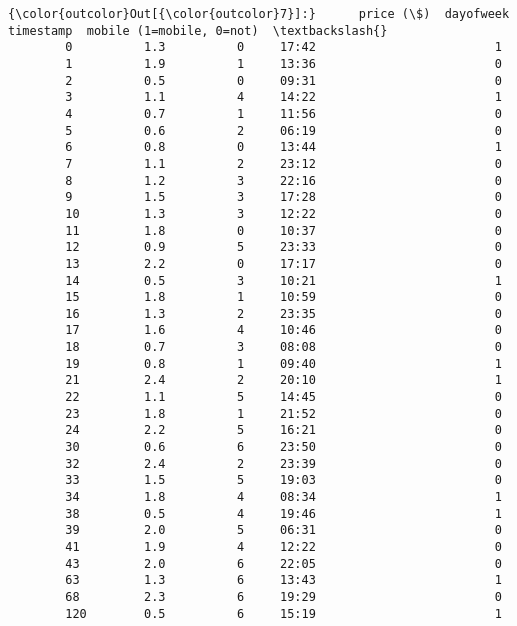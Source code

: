 \documentclass[11pt]{article}
\begin{document}
\begin{Verbatim}[commandchars=\\\{\}]
{\color{outcolor}Out[{\color{outcolor}7}]:}      price (\$)  dayofweek timestamp  mobile (1=mobile, 0=not)  \textbackslash{}
        0          1.3          0     17:42                         1   
        1          1.9          1     13:36                         0   
        2          0.5          0     09:31                         0   
        3          1.1          4     14:22                         1   
        4          0.7          1     11:56                         0   
        5          0.6          2     06:19                         0   
        6          0.8          0     13:44                         1   
        7          1.1          2     23:12                         0   
        8          1.2          3     22:16                         0   
        9          1.5          3     17:28                         0   
        10         1.3          3     12:22                         0   
        11         1.8          0     10:37                         0   
        12         0.9          5     23:33                         0   
        13         2.2          0     17:17                         0   
        14         0.5          3     10:21                         1   
        15         1.8          1     10:59                         0   
        16         1.3          2     23:35                         0   
        17         1.6          4     10:46                         0   
        18         0.7          3     08:08                         0   
        19         0.8          1     09:40                         1   
        21         2.4          2     20:10                         1   
        22         1.1          5     14:45                         0   
        23         1.8          1     21:52                         0   
        24         2.2          5     16:21                         0   
        30         0.6          6     23:50                         0   
        32         2.4          2     23:39                         0   
        33         1.5          5     19:03                         0   
        34         1.8          4     08:34                         1   
        38         0.5          4     19:46                         1   
        39         2.0          5     06:31                         0   
        41         1.9          4     12:22                         0   
        43         2.0          6     22:05                         0   
        63         1.3          6     13:43                         1   
        68         2.3          6     19:29                         0   
        120        0.5          6     15:19                         1   
        

\end{Verbatim}
\end{document}
